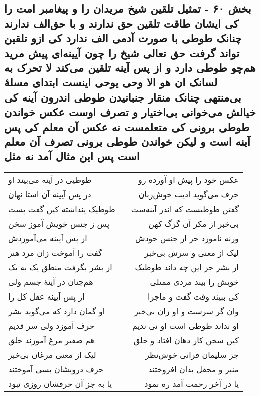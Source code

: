 \begin{center}
\section*{بخش ۶۰ - تمثیل تلقین شیخ مریدان را و پیغامبر امت را کی ایشان طاقت تلقین حق ندارند و با حق‌الف ندارند چنانک طوطی با صورت آدمی الف ندارد کی ازو تلقین تواند گرفت حق تعالی شیخ را چون آیینه‌ای پیش مرید هم‌چو طوطی دارد و از پس آینه تلقین می‌کند لا تحرک به لسانک ان هو الا وحی یوحی اینست ابتدای مسلهٔ بی‌منتهی چنانک منقار جنبانیدن طوطی اندرون آینه کی خیالش می‌خوانی بی‌اختیار و تصرف اوست عکس خواندن طوطی برونی کی متعلمست نه عکس آن معلم کی پس آینه است و لیکن خواندن طوطی برونی تصرف آن معلم است پس این مثال آمد نه مثل}
\label{sec:sh060}
\begin{longtable}{l p{0.5cm} r}
طوطیی در آینه می‌بیند او
&&
عکس خود را پیش او آورده رو
\\
در پس آیینه آن استا نهان
&&
حرف می‌گوید ادیب خوش‌زبان
\\
طوطیک پنداشته کین گفت پست
&&
گفتن طوطیست که اندر آینه‌ست
\\
پس ز جنس خویش آموز سخن
&&
بی‌خبر از مکر آن گرگ کهن
\\
از پس آیینه می‌آموزدش
&&
ورنه ناموزد جز از جنس خودش
\\
گفت را آموخت زان مرد هنر
&&
لیک از معنی و سرش بی‌خبر
\\
از بشر بگرفت منطق یک به یک
&&
از بشر جز این چه داند طوطیک
\\
هم‌چنان در آینهٔ جسم ولی
&&
خویش را بیند مردی ممتلی
\\
از پس آیینه عقل کل را
&&
کی ببیند وقت گفت و ماجرا
\\
او گمان دارد که می‌گوید بشر
&&
وان گر سرست و او زان بی‌خبر
\\
حرف آموزد ولی سر قدیم
&&
او نداند طوطی است او نی ندیم
\\
هم صفیر مرغ آموزند خلق
&&
کین سخن کار دهان افتاد و حلق
\\
لیک از معنی مرغان بی‌خبر
&&
جز سلیمان قرانی خوش‌نظر
\\
حرف درویشان بسی آموختند
&&
منبر و محفل بدان افروختند
\\
یا به جز آن حرفشان روزی نبود
&&
یا در آخر رحمت آمد ره نمود
\\
\end{longtable}
\end{center}
